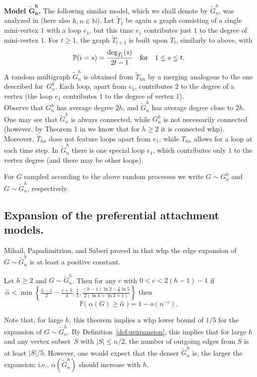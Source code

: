 \documentclass[runningheads, envcountsame, smallextended]{llncs}
\newcommand{\pr}{{\mathbb P}}
\numberwithin{theorem}{section}
\numberwithin{definition}{section}
\numberwithin{lemma}{section}
\numberwithin{corollary}{section}
\numberwithin{proposition}{section}
\numberwithin{conjecture}{section}
\numberwithin{remark}{section}
\numberwithin{equation}{section}
\begin{document}
\noindent\textbf{Model $\mathbf{\tilde{G}_n^h}$.} The following similar model, which we shall denote by $\tilde{G}_n^h$, was analyzed in \cite{mihail2003conf,mihail2006journal} (here also $h,n \in \mathbb{N}$). Let $\tilde{T}_1$ be again a graph consisting of a single mini-vertex $1$ with a loop $e_1$, but this time $e_1$ contributes just $1$ to the degree of mini-vertex $1$. For $t \geq 1$, the graph $\tilde{T}_{t+1}$ is built upon $\tilde{T}_{t}$, similarly to above, with 
%
\[
\pr(i=s) = \frac{\deg_{\tilde{T}_t}(s)}{2t-1}  \quad \textnormal{for} \quad 1 \leq s \leq t.
\]
%
A random multigraph $\tilde{G}_n^h$ is obtained from $\tilde{T}_{hn}$ by a merging analogous to the one described for~$G_n^h$. 
Each loop, apart from $e_1$, contributes $2$ to the degree of a vertex (the loop $e_1$ contributes $1$ to the degree of vertex 1).\\

Observe that $G_n^h$ has average degree $2h$, and $\tilde{G}_n^h$ has average degree close to $2h$. One may see that $\tilde{G}_n^h$ is always connected, while $G_n^h$ is not necessarily connected (however, by Theorem 1 in \cite{Bol_Rio_diameter} we know that for $h\geq 2$ it is connected whp).
Moreover, $\tilde{T}_{hn}$ does not feature loops apart from $e_1$, while $T_{hn}$ allows for a loop at each time step. In $\tilde{G}_n^h$ there is one special loop $e_1$, which contributes only $1$ to the vertex degree (and there may be other loops).

For $G$ sampled according to the above random processes we write $G \sim G_n^h$ and $G \sim \tilde{G}_n^h$, respectively.

\subsection{Expansion of the preferential attachment models.}\label{sec:expansion}

Mihail, Papadimitriou, and Saberi proved in \cite{mihail2006journal} that whp the edge expansion of $G \sim \tilde{G}_n^h$ is at least a positive constant.

\begin{theorem} \label{thm:mihail_expansion} 
	Let $h \geq 2$ and $G \sim \tilde{G}_n^h$. Then for any $c$ with     $0<c<2(h-1)-1$ if $\,\hat{\alpha} < \min\left\{ \frac{h-1}{2}-\frac{c+1}{4}, \frac15, \frac{(h-1)\ln 2 -\frac{2}{5}\ln 5}{2(\ln h +\ln 2 +1)}\right\}$ then  
	\[
	\pr\big(\;\alpha(G) \geq \hat{\alpha}\;\big) = 1 - o(n^{-c}).
	\]
\end{theorem}
Note that, for large $h$, this theorem implies a whp lower bound of $1/5$ for the expansion of $G \sim \tilde{G}_n^h$. By Definition~\ref{def:uexpansion}, this implies that for large $h$ and any vertex subset~$S$ with $|S| \le n/2$, the number of outgoing edges from $S$ is at least $|S|/5$. However, one would expect that the denser $\tilde{G}_n^h$ is, the larger the expansion; i.e., $\alpha(\tilde{G}_n^h)$ should increase with $h$.
\end{document}
